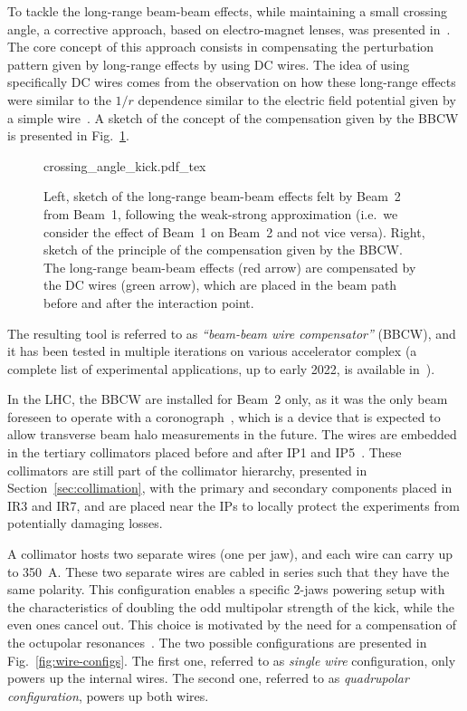 To tackle the long-range beam-beam effects, while maintaining a small crossing angle, a corrective approach, based on electro-magnet lenses, was presented in~\cite{Koutchouk:692058}. The core concept of this approach consists in compensating the perturbation pattern given by long-range effects by using DC wires. The idea of using specifically DC wires comes from the observation on how these long-range effects were similar to the $1/r$ dependence similar to the electric field potential given by a simple wire~\cite{PhysRevSTAB.5.074001}. A sketch of the concept of the compensation given by the BBCW is presented in Fig.~\ref{fig:wire-baseline}.

\begin{figure}[hpt]
    \centering
    \def\svgwidth{1.0\textwidth}
    {crossing_angle_kick.pdf_tex}
    \caption{Left, sketch of the long-range beam-beam effects felt by Beam~2 from Beam~1, following the weak-strong approximation (i.e.\ we consider the effect of Beam~1 on Beam~2 and not vice versa). Right, sketch of the principle of the compensation given by the BBCW. The long-range beam-beam effects (red arrow) are compensated by the DC wires (green arrow), which are placed in the beam path before and after the interaction point.}
    \label{fig:wire-baseline}
\end{figure}

The resulting tool is referred to as \textit{``beam-beam wire compensator''} (BBCW), and it has been tested in multiple iterations on various accelerator complex (a complete list of experimental applications, up to early 2022, is available in~\cite{axel.wires}).

In the LHC, the BBCW are installed for Beam~2 only, as it was the only beam foreseen to operate with a coronograph~\cite{Goldblatt:2313940}, which is a device that is expected to allow transverse beam halo measurements in the future. The wires are embedded in the tertiary collimators placed before and after IP1 and IP5~\cite{Rossi:2696270}. These collimators are still part of the collimator hierarchy, presented in Section~\ref{sec:collimation}, with the primary and secondary components placed in IR3 and IR7, and are placed near the IPs to locally protect the experiments from potentially damaging losses.

A collimator hosts two separate wires (one per jaw), and each wire can carry up to \SI{350}{\ampere}. These two separate wires are cabled in series such that they have the same polarity. This configuration enables a specific 2-jaws powering setup with the characteristics of doubling the odd multipolar strength of the kick, while the even ones cancel out. This choice is motivated by the need for a compensation of the octupolar resonances~\cite{Poyet:2703503}. The two possible configurations are presented in Fig.~\ref{fig:wire-configs}. The first one, referred to as \textit{single wire} configuration, only powers up the internal wires. The second one, referred to as \textit{quadrupolar configuration}, powers up both wires.

